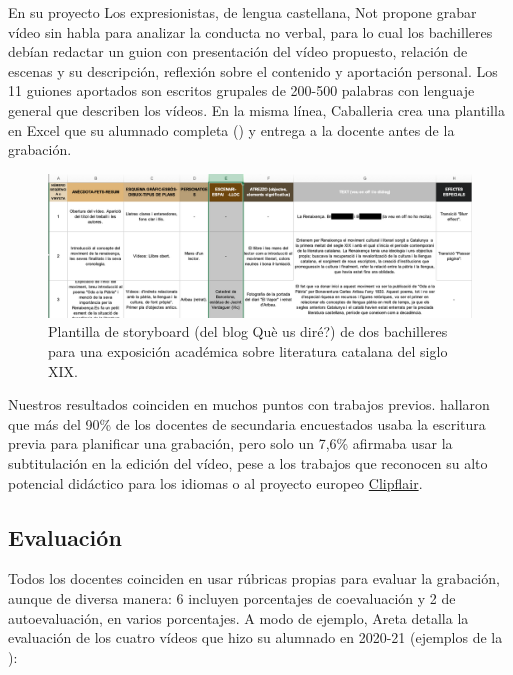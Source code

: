 \documentclass[spanish]{textolivre}
\begin{document}
En su proyecto Los expresionistas, de lengua castellana, Not propone grabar vídeo sin habla para analizar la conducta no verbal, para lo cual los bachilleres debían redactar un guion con presentación del vídeo propuesto, relación de escenas y su descripción, reflexión sobre el contenido y aportación personal. Los 11 guiones aportados son escritos grupales de 200-500 palabras con lenguaje general que describen los vídeos. En la misma línea, Caballeria crea una plantilla en Excel que su alumnado completa () y entrega a la docente antes de la grabación.

\begin{figure}[htbp]
 \centering
 \includegraphics[width=\textwidth]{Fig5.png}
 \caption{Plantilla de storyboard (del blog Què us diré?) de dos bachilleres para una exposición académica sobre literatura catalana del siglo XIX.}
 \label{fig08}
\end{figure}

Nuestros resultados coinciden en muchos puntos con trabajos previos. \textcite{cassany_ya_2021} hallaron que más del 90\% de los docentes de secundaria encuestados usaba la escritura previa para planificar una grabación, pero solo un 7,6\% afirmaba usar la subtitulación en la edición del vídeo, pese a los trabajos que reconocen su alto potencial didáctico para los idiomas \cite{cassany_daniel_coord._fandom_2019} o al proyecto europeo \hyperlink{http://clipflair.net/}{Clipflair}.

\subsection{Evaluación}\label{sec-secoes}
Todos los docentes coinciden en usar rúbricas propias para evaluar la grabación, aunque de diversa manera: 6 incluyen porcentajes de coevaluación y 2 de autoevaluación, en varios porcentajes. A modo de ejemplo, Areta detalla la evaluación de los cuatro vídeos que hizo su alumnado en 2020-21 (ejemplos de la ):
\end{document}

